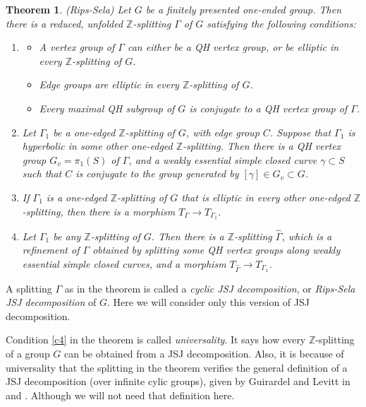 \documentclass[12pt]{amsart}
\newtheorem{theorem}{Theorem}[section]
\newcommand{\Z}{\mathbb{Z}}
\begin{document}
\begin{theorem}(Rips-Sela) \label{rips-sela} Let $G$ be a finitely presented one-ended group. Then there is a reduced, unfolded $\Z$-splitting $\Gamma$ of $G$ satisfying the following conditions:
\begin{enumerate}
\item \label{c1}
\begin{itemize}
\item[(a)] A vertex group of $\Gamma$ can either be a QH vertex group, or be elliptic in every $\Z$-splitting of $G$.
\item[(b)] Edge groups are elliptic in every $\Z$-splitting of $G$. 
\item[(c)] Every maximal QH subgroup of $G$ is conjugate to a QH vertex group of $\Gamma$.
\end{itemize}
\item \label{c2} Let $\Gamma_1$ be a one-edged $\Z$-splitting of $G$, with edge group $C$. Suppose that $\Gamma_1$ is hyperbolic in some other one-edged $\Z$-splitting. Then there is a QH vertex group $G_v=\pi_1(S)$ of $\Gamma$, and a weakly essential simple closed curve $\gamma\subset S$ such that $C$ is conjugate to the group generated by $[\gamma]\in G_v\subset G$.

\item \label{c3} If $\Gamma_1$ is a one-edged $\Z$-splitting of $G$ that is elliptic in every other one-edged $\Z$-splitting, then there is a morphism $T_{\Gamma}\to T_{\Gamma_1}$.

\item \label{c4} Let $\Gamma_1$ be any $\Z$-splitting of $G$. Then there is a $\Z$-splitting $\hat\Gamma$, which is a refinement of $\Gamma$ obtained by splitting some QH vertex groups along weakly essential simple closed curves, and a morphism $T_{\hat\Gamma}\to T_{\Gamma_1}$. 
\end{enumerate} 
\end{theorem}

A splitting $\Gamma$ as in the theorem is called a {\em cyclic JSJ decomposition}, or {\em Rips-Sela JSJ decomposition} of $G$. Here we will consider only this version of JSJ decomposition.

Condition \ref{c4} in the theorem is called {\em universality}. It says how every $\Z$-splitting of a group $G$ can be obtained from a JSJ decomposition. Also, it is because of universality that the splitting in the theorem verifies the general definition of a JSJ decomposition (over infinite cylic groups), given by Guirardel and Levitt in \cite{gl0} and \cite{gl1}. Although we will not need that definition here.
\end{document}
